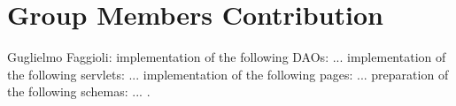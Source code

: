 \section{Group Members Contribution}

Guglielmo Faggioli: implementation of the following DAOs: ... implementation of the following servlets: ... implementation of the following pages: ...  preparation of the following schemas: ... .